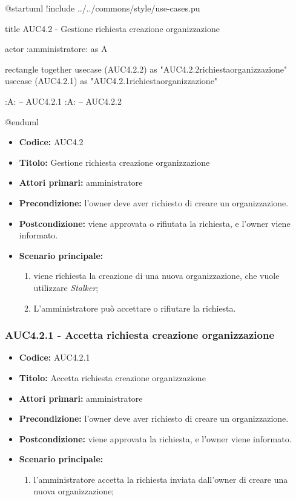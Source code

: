 \documentclass[casi-duso]{subfiles}
\begin{document}
\begin{plantuml}
@startuml
!include ../../commons/style/use-cases.pu

title AUC4.2 - Gestione richiesta creazione organizzazione

actor :amministratore: as A

rectangle {
  together {
    usecase (AUC4.2.2) as "AUC4.2.2\nRifiuta richiesta\ncreazione organizzazione"
    usecase (AUC4.2.1) as "AUC4.2.1\nAccetta richiesta\ncreazione organizzazione"
  }
}

:A: -- AUC4.2.1
:A: -- AUC4.2.2

@enduml
\end{plantuml}

\begin{itemize}
  \item \textbf{Codice:} AUC4.2
  \item \textbf{Titolo:} Gestione richiesta creazione organizzazione
  \item \textbf{Attori primari:} amministratore
  \item \textbf{Precondizione:} l'owner deve aver richiesto di creare un organizzazione.
  \item \textbf{Postcondizione:} viene approvata o rifiutata la richiesta, e l'owner viene informato.
  \item \textbf{Scenario principale:}
  \begin{enumerate}
    \item viene richiesta la creazione di una nuova organizzazione, che vuole utilizzare \emph{Stalker};
    \item L'amministratore può accettare o rifiutare la richiesta.
  \end{enumerate}
\end{itemize}

\subsubsection{AUC4.2.1 - Accetta richiesta creazione organizzazione}%
\label{subsub:AUC4.2.1}
\begin{itemize}
  \item \textbf{Codice:} AUC4.2.1
  \item \textbf{Titolo:} Accetta richiesta creazione organizzazione
  \item \textbf{Attori primari:} amministratore
  \item \textbf{Precondizione:} l'owner deve aver richiesto di creare un organizzazione.
  \item \textbf{Postcondizione:} viene approvata la richiesta, e l'owner viene informato.
  \item \textbf{Scenario principale:}
  \begin{enumerate}
    \item  l'amministratore accetta la richiesta inviata dall'owner di creare una nuova organizzazione;
  \end{enumerate}
\end{itemize}
\end{document}
